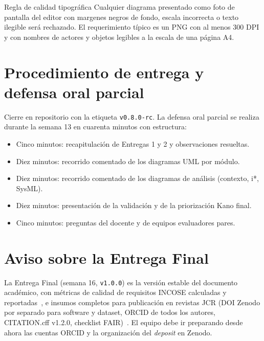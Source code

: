 \documentclass[11pt,a4paper]{article}
\begin{document}
\begin{cajacritica}{Regla de calidad tipogr\'afica}
Cualquier diagrama presentado como foto de pantalla del editor con margenes negros de fondo, escala incorrecta o texto ilegible ser\'a rechazado. El requerimiento t\'ipico es un PNG con al menos 300 DPI y con nombres de actores y objetos legibles a la escala de una p\'agina A4.
\end{cajacritica}

\section{Procedimiento de entrega y defensa oral parcial}

Cierre en repositorio con la etiqueta \texttt{v0.8.0-rc}. La defensa oral parcial se realiza durante la semana 13 en cuarenta minutos con estructura:

\begin{itemize}
    \item Cinco minutos: recapitulaci\'on de Entregas 1 y 2 y observaciones resueltas.
    \item Diez minutos: recorrido comentado de los diagramas UML por m\'odulo.
    \item Diez minutos: recorrido comentado de los diagramas de an\'alisis (contexto, i*, SysML).
    \item Diez minutos: presentaci\'on de la validaci\'on y de la priorizaci\'on Kano final.
    \item Cinco minutos: preguntas del docente y de equipos evaluadores pares.
\end{itemize}

\section{Aviso sobre la Entrega Final}

La Entrega Final (semana 16, \texttt{v1.0.0}) es la versi\'on estable del documento acad\'emico, con m\'etricas de calidad de requisitos INCOSE calculadas y reportadas~\cite{incose2023requirements}, e insumos completos para publicaci\'on en revistas JCR (DOI Zenodo por separado para software y dataset, ORCID de todos los autores, CITATION.cff v1.2.0, checklist FAIR)~\cite{wilkinson2016fair,ralph2021empirical}. El equipo debe ir preparando desde ahora las cuentas ORCID y la organizaci\'on del \emph{deposit} en Zenodo.



\end{document}
